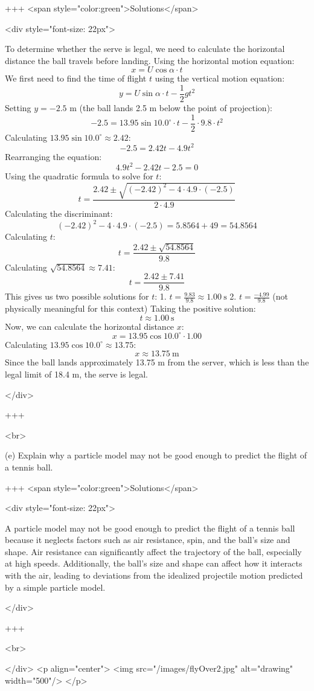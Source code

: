 +++ <span style="color:green">Solutions</span>

<div style="font-size: 22px">

To determine whether the serve is legal, we need to calculate the horizontal distance the ball travels before landing.
Using the horizontal motion equation:
$$ x = U \cos \alpha \cdot t $$
We first need to find the time of flight \( t \) using the vertical motion equation:
$$ y = U \sin \alpha \cdot t - \frac{1}{2} g t^2 $$
Setting \( y = -2.5 \) m (the ball lands 2.5 m below the point of projection):
$$ -2.5 = 13.95 \sin 10.0^{\circ} \cdot t - \frac{1}{2} \cdot 9.8 \cdot t^2 $$
Calculating \( 13.95 \sin 10.0^{\circ} \approx 2.42 \):
$$ -2.5 = 2.42t - 4.9t^2 $$
Rearranging the equation:
$$ 4.9t^2 - 2.42t - 2.5 = 0 $$
Using the quadratic formula to solve for \( t \):
$$ t = \frac{2.42 \pm \sqrt{(-2.42)^2 - 4 \cdot 4.9 \cdot (-2.5)}}{2 \cdot 4.9} $$
Calculating the discriminant:
$$ (-2.42)^2 - 4 \cdot 4.9 \cdot (-2.5) = 5.8564 + 49 = 54.8564 $$
Calculating \( t \):
$$ t = \frac{2.42 \pm \sqrt{54.8564}}{9.8} $$
Calculating \( \sqrt{54.8564} \approx 7.41 \):
$$ t = \frac{2.42 \pm 7.41}{9.8} $$
This gives us two possible solutions for \( t \):
1. \( t = \frac{9.83}{9.8} \approx 1.00 \mathrm{~s} \)
2. \( t = \frac{-4.99}{9.8} \) (not physically meaningful for this context)
Taking the positive solution:
$$ t \approx 1.00 \mathrm{~s} $$
Now, we can calculate the horizontal distance \( x \):
$$ x = 13.95 \cos 10.0^{\circ} \cdot 1.00 $$
Calculating \( 13.95 \cos 10.0^{\circ} \approx 13.75 \):
$$ x \approx 13.75 \mathrm{~m} $$
Since the ball lands approximately 13.75 m from the server, which is less than the legal limit of 18.4 m, the serve is legal.

</div>

+++

<br>

(e) Explain why a particle model may not be good enough to predict the flight of a tennis ball.

+++ <span style="color:green">Solutions</span>

<div style="font-size: 22px">

A particle model may not be good enough to predict the flight of a tennis ball because it neglects factors such as air resistance, spin, and the ball's size and shape. Air resistance can significantly affect the trajectory of the ball, especially at high speeds. Additionally, the ball's size and shape can affect how it interacts with the air, leading to deviations from the idealized projectile motion predicted by a simple particle model.

</div>

+++

<br>

</div>
<p align="center">
<img src="/images/flyOver2.jpg" alt="drawing" width="500"/>
</p>